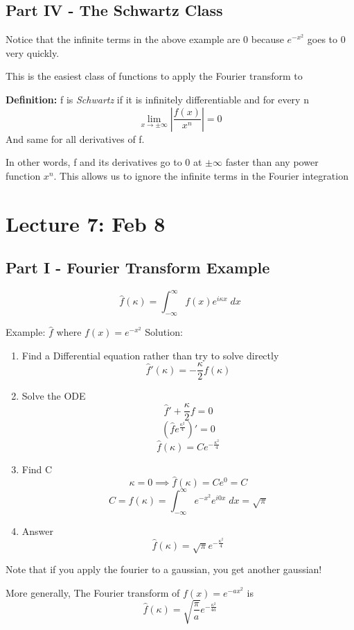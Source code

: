 \documentclass[12pt]{article}
\newcommand{\ans}[1]{\boxed{\text{#1}}}
\renewcommand{\hat}[1]{\widehat{#1}}
\begin{document}
\subsection*{Part IV - The Schwartz Class}
Notice that the infinite terms in the above example are 0 because $e^{-x^2}$ goes to 0 very quickly. 

This is the easiest class of functions to apply the Fourier transform to 

\textbf{Definition:} f is \emph{Schwartz} if it is infinitely differentiable and for every n 
\[\lim_{x\to \pm \infty} \left|\frac{f(x)}{x^n}\right| = 0\]
And same for all derivatives of f.

In other words, f and its derivatives go to 0 at $\pm \infty$ faster than any power function $x^n$. This allows us to ignore the infinite terms in the Fourier integration

\section{Lecture 7: Feb 8}
\subsection*{Part I - Fourier Transform Example}
\[\hat{f}(\kappa) = \int_{-\infty}^\infty f(x) e^{i \kappa x}\; dx \]

Example: $\hat{f}$ where $f(x) = e^{-x^2}$
Solution: 
\begin{enumerate}
    \item Find a Differential equation rather than try to solve directly
    \[\hat{f}'(\kappa) = -\frac{\kappa}{2} f(\kappa)\]
    \item Solve the ODE 
    \[\hat{f}' + \frac{\kappa}{2}f = 0\]
    \[\left(\hat{f}e^{\frac{\kappa^2}{4}}\right)' = 0\]
    \[\hat{f}(\kappa) = Ce^{-\frac{\kappa^2}{4}}\]
    \item Find C
    \[\kappa = 0 \implies \hat{f}(\kappa) = Ce^0 = C\]
    \[C = \hat{f}(\kappa) = \int_{-\infty}^{\infty}e^{-x^2}e^{i0x} \; dx = \sqrt{\pi} \]
    \item Answer 
    \[\ans{$\hat{f}(\kappa) = \sqrt{\pi} e^{-\frac{\kappa^2}{4}}$}\]
\end{enumerate} 

Note that if you apply the fourier to a gaussian, you get another gaussian! 

More generally, 
The Fourier transform of $f(x) = e^{-ax^2}$ is
\[\ans{$\hat{f}(\kappa) = \sqrt{\frac{\pi}{a}}e^{-\frac{\kappa^2}{4a}}$}\]
\end{document}
